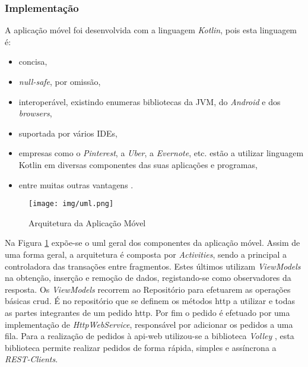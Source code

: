 \subsubsection{Implementação}

A aplicação móvel foi desenvolvida com a linguagem \textit{Kotlin}, pois esta linguagem é: 
\begin{itemize}
    \item concisa,
    \item \textit{null-safe}, por omissão,
    \item interoperável, existindo enumeras bibliotecas da JVM, do \textit{Android} e dos \textit{browsers},
    \item suportada por vários IDEs,
    \item empresas como o \textit{Pinterest}, a \textit{Uber}, a \textit{Evernote}, etc. estão a utilizar linguagem Kotlin em diversas componentes das suas aplicações e programas,
    \item entre muitas outras vantagens \cite{WhyKotlin:kotlin}.
\end{itemize}

\begin{figure}[H]
	\centering
	\texttt{[image: img/uml.png]}
	\caption{Arquitetura da Aplicação Móvel}
	\label{mobile-app-architecture}
\end{figure}

Na Figura \ref{mobile-app-architecture} expõe-se o \acrfull{uml} geral dos componentes da aplicação móvel. Assim de uma forma geral, a arquitetura é composta por \textit{Activities}, sendo a principal a controladora das transações entre fragmentos. Estes últimos utilizam \textit{ViewModels} na obtenção, inserção e remoção de dados, registando-se como observadores da resposta. Os \textit{ViewModels} recorrem ao Repositório para efetuarem as operações básicas \acrshort{crud}. É no repositório que se definem os métodos \acrshort{http} a utilizar e todas as partes integrantes de um pedido \acrshort{http}. Por fim o pedido é efetuado por uma implementação de \textit{HttpWebService}, responsável por adicionar os pedidos a uma fila. Para a realização de pedidos à \gls{api-web} utilizou-se a biblioteca \textit{Volley} \cite{Volley:android}, esta biblioteca permite realizar pedidos de forma rápida, simples e assíncrona a \textit{REST-Clients}.




